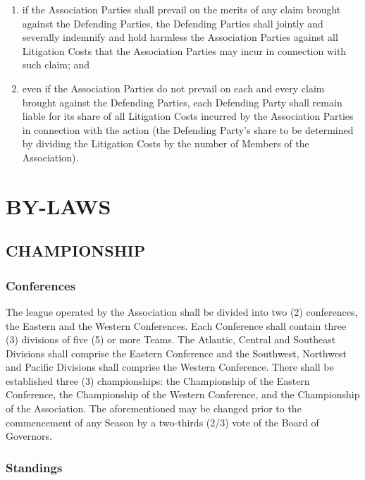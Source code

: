 \documentclass[]{book}
\providecommand{\tightlist}{%
  \setlength{\itemsep}{0pt}\setlength{\parskip}{0pt}}
\theoremstyle{definition}
\theoremstyle{definition}
\theoremstyle{definition}
\theoremstyle{remark}
\begin{document}
\begin{enumerate}
  \begin{enumerate}
  \def\labelenumii{(\roman{enumii})}
  \tightlist
  \item
    if the Association Parties shall prevail on the merits of any claim
    brought against the Defending Parties, the Defending Parties shall
    jointly and severally indemnify and hold harmless the Association
    Parties against all Litigation Costs that the Association Parties
    may incur in connection with such claim; and
  \item
    even if the Association Parties do not prevail on each and every
    claim brought against the Defending Parties, each Defending Party
    shall remain liable for its share of all Litigation Costs incurred
    by the Association Parties in connection with the action (the
    Defending Party's share to be determined by dividing the Litigation
    Costs by the number of Members of the Association).
  \end{enumerate}
\end{enumerate}

\chapter{BY-LAWS}\label{by-laws}

\section{CHAMPIONSHIP}\label{championship}

\subsection{Conferences}\label{conferences}

The league operated by the Association shall be divided into two (2)
conferences, the Eastern and the Western Conferences. Each Conference
shall contain three (3) divisions of five (5) or more Teams. The
Atlantic, Central and Southeast Divisions shall comprise the Eastern
Conference and the Southwest, Northwest and Pacific Divisions shall
comprise the Western Conference. There shall be established three (3)
championships: the Championship of the Eastern Conference, the
Championship of the Western Conference, and the Championship of the
Association. The aforementioned may be changed prior to the commencement
of any Season by a two-thirds (2/3) vote of the Board of Governors.

\subsection{Standings}\label{standings}
\end{document}
